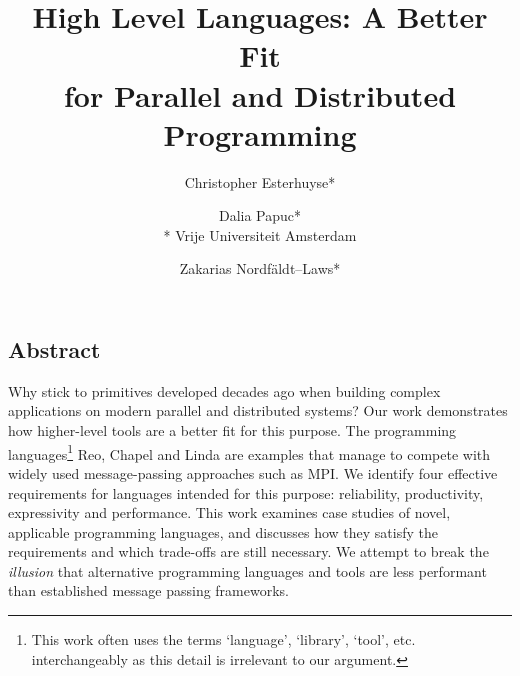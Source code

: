 \documentclass[letterpaper,twocolumn,10pt]{article}
\begin{document}
\date{}

\title{\Large \bf High Level Languages: A Better Fit \\for Parallel and Distributed Programming
}



\author{
{\rm Christopher Esterhuyse*}\\
\and
{\rm Dalia Papuc*}\\
\** Vrije Universiteit Amsterdam \\
\and
{\rm Zakarias Nordf{\"a}ldt--Laws*}\\
} %
\maketitle

\thispagestyle{empty}

\subsection*{Abstract}




Why stick to primitives developed decades ago when building complex applications on modern parallel and distributed systems? Our work demonstrates how higher-level tools are a better fit for this purpose. The programming languages\footnote{This work often uses the terms `language', `library', `tool', etc. interchangeably as this detail is irrelevant to our argument.} Reo, Chapel and Linda are examples that manage to compete with widely used message-passing approaches such as MPI. We identify four effective requirements for languages intended for this purpose: reliability, productivity, expressivity and performance.
This work examines case studies of novel, applicable programming languages, and discusses how they satisfy the requirements and which trade-offs are still necessary. 
We attempt to break the \textit{illusion} that alternative programming languages and tools are less performant than established message passing frameworks.
\end{document}
